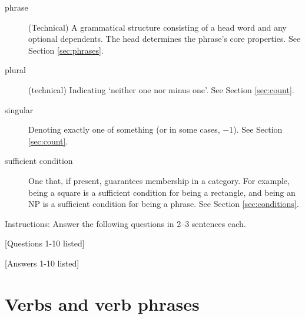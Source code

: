 \begin{description}
   \item[phrase] (Technical) A grammatical structure consisting of a head word and any optional dependents. The head determines the phrase's core properties. See Section \ref{sec:phrases}.
   
   \item[plural] (technical) Indicating `neither one nor minus one'. See Section \ref{sec:count}.
   
   \item[singular] Denoting exactly one of something (or in some cases, $-1$). See Section \ref{sec:count}.
   
   \item[sufficient condition] One that, if present, guarantees membership in a category. For example, being a square is a sufficient condition for being a rectangle, and being an NP is a sufficient condition for being a phrase. See Section \ref{sec:conditions}.
\end{description}

\begin{tcolorbox}[title=Short Answer Quiz, colback=white]

Instructions: Answer the following questions in 2--3 sentences each.

[Questions 1-10 listed]
    
\end{tcolorbox}

\begin{tcolorbox}[title=Answer Key, colback=white, colframe=black, coltitle=black, fonttitle=\bfseries, colbacktitle=gray!10!white]

[Answers 1-10 listed]

\end{tcolorbox}

\clearpage
\section{Verbs and verb phrases}\label{sec:verbs}

